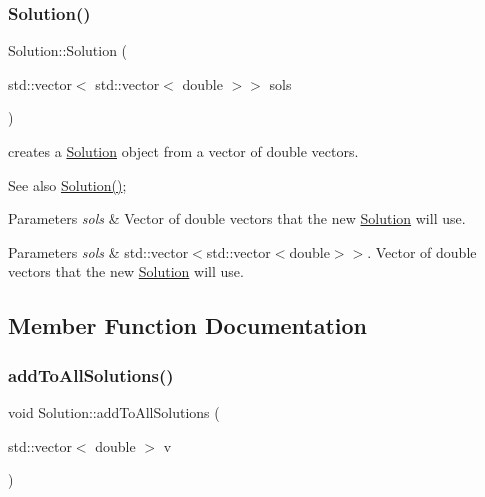 \subsubsection{\texorpdfstring{Solution()}{Solution()}\hspace{0.1cm}{\footnotesize\ttfamily [2/2]}}
{\footnotesize\ttfamily Solution\+::\+Solution (\begin{DoxyParamCaption}\item[{std\+::vector$<$ std\+::vector$<$ double $>$$>$}]{sols }\end{DoxyParamCaption})}

creates a \hyperlink{class_solution}{Solution} object from a vector of double vectors. \begin{DoxySeeAlso}{See also}
\hyperlink{class_solution_ab55bd4b023d596ce11aaf737b9a6123b}{Solution()}; 
\end{DoxySeeAlso}

\begin{DoxyParams}{Parameters}
{\em sols} & Vector of double vectors that the new \hyperlink{class_solution}{Solution} will use. \\
\hline
\end{DoxyParams}

\begin{DoxyParams}{Parameters}
{\em sols} & std\+::vector$<$std\+::vector$<$double$>$$>$. Vector of double vectors that the new \hyperlink{class_solution}{Solution} will use. \\
\hline
\end{DoxyParams}


\subsection{Member Function Documentation}
\mbox{\label{class_solution_a0ea58d9480ccb4e344c377f4861e1e7f}} 
\subsubsection{\texorpdfstring{add\+To\+All\+Solutions()}{addToAllSolutions()}}
{\footnotesize\ttfamily void Solution\+::add\+To\+All\+Solutions (\begin{DoxyParamCaption}\item[{std\+::vector$<$ double $>$}]{v }\end{DoxyParamCaption})}

